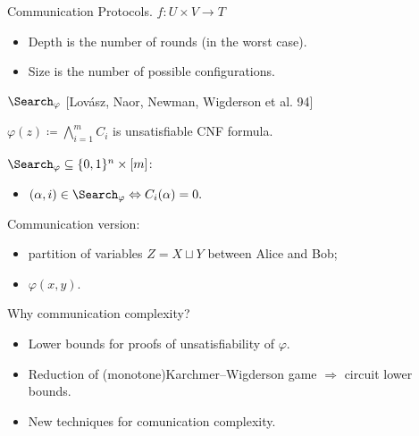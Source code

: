 \begin{frame}{Communication Protocols. $f\colon U \times V \to T$}
    \begin{center}
    	    
    \end{center}

    \pause
    \pause
    \pause
	\pause

    \begin{itemize}
        \item Depth is the number of rounds (in the worst case).
        \item Size is the number of possible configurations.
    \end{itemize}
\end{frame}

\begin{frame}{$\Search_{\varphi}$ [Lov{\'{a}}sz, Naor, Newman, Wigderson et al. 94]}

    $\varphi(z) \coloneqq \bigwedge\limits_{i = 1}^{m} C_i$ is unsatisfiable CNF formula.
    \pause
    
    $\Search_{\varphi} \subseteq \{0, 1\}^n \times [m]$:
    \begin{itemize}
        \item $(\alpha, i) \in \Search_{\varphi} \Leftrightarrow C_{i}(\alpha) = 0.$
    \end{itemize}
    
    \pause
    \vspace{0.4cm}
    Communication version:
    \begin{itemize}
        \item partition of variables $Z = X \sqcup Y$ between Alice and Bob;
        \item $\varphi(x, y)$.
    \end{itemize}

\end{frame}

\begin{frame}{Why communication complexity?}

    \begin{itemize}
        \item Lower bounds for proofs of unsatisfiability of $\varphi$.
        \item Reduction of (monotone)Karchmer--Wigderson game $\Rightarrow$ circuit lower bounds.
        \item New techniques for comunication complexity.
    \end{itemize}
\end{frame}

